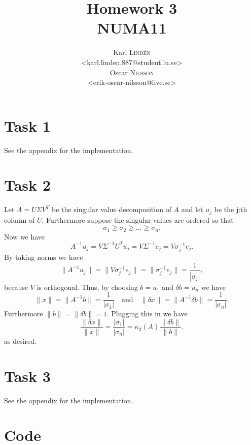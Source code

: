 \documentclass[a4paper,12pt]{article}
\begin{document}
\title{Homework 3 \\ NUMA11}
\author{
  Karl \textsc{Lind\'{e}n} \\
  <karl.linden.887@student.lu.se> \\
  Oscar \textsc{Nilsson} \\
  <erik-oscar-nilsson@live.se>
}

\maketitle
\thispagestyle{empty}

\newpage


\section*{Task 1}

See the appendix for the implementation.


\section*{Task 2}

Let \(A = U \Sigma V^T\) be the singular value decomposition of \(A\) and let
\(u_j\) be the j:th column of \(U\).
Furthermore suppose the singular values are ordered so that
\[ \sigma_1 \ge \sigma_2 \ge \dots \ge \sigma_n. \]
Now we have
\[
  A^{-1} u_j
    = V \Sigma^{-1}U^T u_j
    = V \Sigma^{-1} e_j
    = V \sigma_j^{-1} e_j.
\]
By taking norms we have
\[
  \|A^{-1} u_j\|
    = \|V \sigma_j^{-1} e_j\|
    = \|\sigma_j^{-1} e_j\|
    = \frac{1}{|\sigma_j|}, \]
because \(V\) is orthogonal.
Thus, by choosing \(b = u_1\) and \(\delta b = u_n\) we have
\[
  \|x\| = \|A^{-1}b\| = \frac{1}{|\sigma_1|}
  \quad \text{and} \quad
  \|\delta x\| = \|A^{-1} \delta b\| = \frac{1}{|\sigma_n|}.
\]
Furthermore \(\|b\| = \|\delta b\| = 1\).
Plugging this in we have
\[
  \frac{\|\delta x\|}{\|x\|}
    = \frac{|\sigma_1|}{|\sigma_n|}
    = \kappa_2(A) \frac{\|\delta b\|}{\|b\|}.
\]
as desired.

\section*{Task 3}

See the appendix for the implementation.


\clearpage
\appendix
\section{Code}


\end{document}
